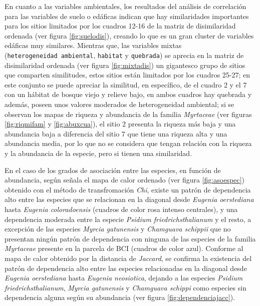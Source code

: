 \documentclass[11pt,]{article}
\begin{document}
En cuanto a las variables ambientales, los resultados del análisis de
correlación para las variables de suelo o edáficas indican que hay
similaridades importantes para los sitios limitados por los cuadros
12-16 de la matriz de disimilaridad ordenada (ver figura
\ref{fig:suelodis}), creando lo que es un gran cluster de variables
edáficas muy similares. Mientras que, las variables mixtas
(\texttt{heterogeneidad\ ambiental}, \texttt{habitat} y
\texttt{quebrada}) se aprecia en la matriz de disimilaridad ordenada
(ver figura \ref{fig:mixtadis}) un gigantesco grupo de sitios que
comparten similitudes, estos sitios están limitados por los cuadros
25-27; en este conjunto se puede apreciar la similitud, en específico,
de el cuadro 2 y el 7 con un hábitat de bosque viejo y relieve bajo, en
ambos cuadros hay quebrada y además, poseen unos valores moderados de
heterogeneidad ambiental; si se observan los mapas de riqueza y
abundancia de la familia \emph{Myrtaceae} (ver figuras
\ref{fig:riqmifam} y \ref{fig:abuxcua}), el sitio 2 presenta la riqueza
más baja y una abundancia baja a diferencia del sitio 7 que tiene una
riqueza alta y una abundancia media, por lo que no se considera que
tengan relación con la riqueza y la abundancia de la especie, pero si
tienen una similaridad.

En el caso de los grados de asociación entre las especies, en función de
abundancia, según señala el mapa de calor ordenado (ver figura
\ref{fig:asoespec}) obtenido con el método de transfromación \emph{Chi},
existe un patrón de dependencia alto entre las especies que se
relacionan en la diagonal desde \emph{Eugenia oerstediana} hasta
\emph{Eugenia coloradoensis} (cuadros de color rosa intenso centrales),
y una dependencia moderada entre la especie \emph{Psidium
friedrichsthalianum} y el resto, a excepción de las especies
\emph{Myrcia gatunensis} y \emph{Chamguava schippii} que no presentan
ningún patrón de dependencia con ninguna de las especies de la familia
\emph{Myrtaceae} presente en la parcela de BCI (cuadros de color azul).
Conforme al mapa de calor obtenido por la distancia de \emph{Jaccard},
se confirma la existencia del patrón de dependencia alto entre las
especies relacionadas en la diagonal desde \emph{Eugenia oerstediana}
hasta \emph{Eugenia neosiotica}, dejando a las especies \emph{Psidium
friedrichsthalianum}, \emph{Myrcia gatunensis} y \emph{Chamguava
schippi} como especies sin dependencia alguna según su abundancia (ver
figura \ref{fig:dependenciajacc}).
\end{document}
